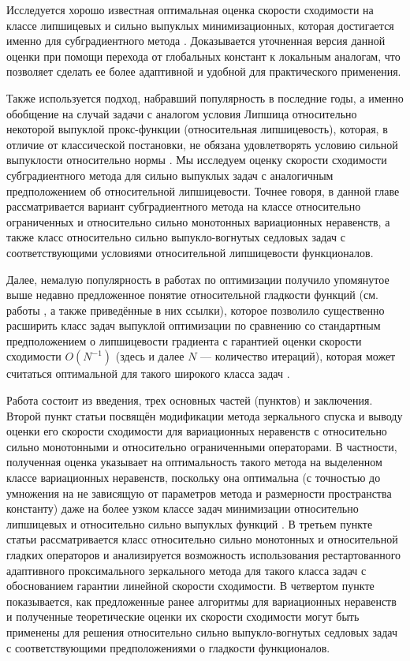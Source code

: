 Исследуется хорошо известная оптимальная оценка скорости сходимости на классе липшицевых и сильно выпуклых минимизационных, которая достигается именно для субградиентного метода \cite{Simon_Julien_Bach_2012}. Доказывается уточненная версия данной оценки при помощи перехода от глобальных констант к локальным аналогам, что позволяет сделать ее более адаптивной и удобной для практического применения. 

Также используется подход, набравший популярность в последние годы, а именно обобщение на случай задачи с аналогом условия Липшица относительно некоторой выпуклой прокс-функции (относительная липшицевость), которая, в отличие от классической постановки, не обязана удовлетворять условию сильной выпуклости относительно нормы \cite{AdaMirr_2021,Lu_2018,Zhou_NIPS_2020}. Мы исследуем оценку скорости сходимости субградиентного метода для сильно выпуклых задач с аналогичным предположением об относительной липшицевости. Точнее говоря, в данной главе рассматривается вариант субградиентного метода на классе относительно ограниченных и относительно сильно монотонных вариационных неравенств, а также класс относительно сильно выпукло-вогнутых седловых задач с соответствующими условиями относительной липшицевости функционалов. 

Далее, немалую популярность в работах по оптимизации получило упомянутое выше недавно предложенное понятие относительной гладкости функций (см. работы \cite{Bauschke,Drag,Dragomir,Lu_Nesterov_2018}, а также приведённые в них ссылки), которое позволило существенно расширить класс задач выпуклой оптимизации по сравнению со стандартным предположением о липшицевости градиента с гарантией оценки скорости сходимости $O(N^{-1})$ (здесь и далее $N$ --- количество итераций), которая может считаться оптимальной для такого широкого класса задач \cite{Dragomir}. 

Работа состоит из введения, трех основных частей (пунктов) и заключения. Второй пункт статьи посвящён модификации метода зеркального спуска и выводу оценки его скорости сходимости для вариационных неравенств с относительно сильно монотонными и относительно ограниченными операторами. В частности, полученная оценка указывает на оптимальность такого метода на выделенном классе вариационных неравенств, поскольку она оптимальна (с точностью до умножения на не зависящую от параметров метода и размерности пространства константу) даже на более узком классе задач минимизации относительно липшицевых и относительно сильно выпуклых функций \cite{Lu_2018}. В третьем пункте статьи рассматривается класс относительно сильно монотонных и относительной гладких операторов и анализируется возможность использования рестартованного адаптивного проксимального зеркального метода для такого класса задач с обоснованием гарантии линейной скорости сходимости. В четвертом пункте показывается, как предложенные ранее алгоритмы для вариационных неравенств и полученные теоретические оценки их скорости сходимости могут быть применены для решения относительно сильно выпукло-вогнутых седловых задач с соответствующими предположениями о гладкости функционалов.

